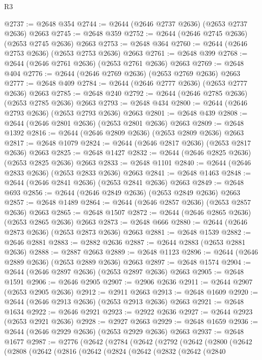 \begin{lexlean}{R3}
\begin{coremodule}
@2737 := @2648 @354
@2744 := @2644 (@2646 @2737 @2636) (@2653 @2737 @2636) @2663
@2745 := @2648 @359
@2752 := @2644 (@2646 @2745 @2636) (@2653 @2745 @2636) @2663
@2753 := @2648 @364
@2760 := @2644 (@2646 @2753 @2636) (@2653 @2753 @2636) @2663
@2761 := @2648 @399
@2768 := @2644 (@2646 @2761 @2636) (@2653 @2761 @2636) @2663
@2769 := @2648 @404
@2776 := @2644 (@2646 @2769 @2636) (@2653 @2769 @2636) @2663
@2777 := @2648 @409
@2784 := @2644 (@2646 @2777 @2636) (@2653 @2777 @2636) @2663
@2785 := @2648 @240
@2792 := @2644 (@2646 @2785 @2636) (@2653 @2785 @2636) @2663
@2793 := @2648 @434
@2800 := @2644 (@2646 @2793 @2636) (@2653 @2793 @2636) @2663
@2801 := @2648 @439
@2808 := @2644 (@2646 @2801 @2636) (@2653 @2801 @2636) @2663
@2809 := @2648 @1392
@2816 := @2644 (@2646 @2809 @2636) (@2653 @2809 @2636) @2663
@2817 := @2648 @1079
@2824 := @2644 (@2646 @2817 @2636) (@2653 @2817 @2636) @2663
@2825 := @2648 @1427
@2832 := @2644 (@2646 @2825 @2636) (@2653 @2825 @2636) @2663
@2833 := @2648 @1101
@2840 := @2644 (@2646 @2833 @2636) (@2653 @2833 @2636) @2663
@2841 := @2648 @1463
@2848 := @2644 (@2646 @2841 @2636) (@2653 @2841 @2636) @2663
@2849 := @2648 @693
@2856 := @2644 (@2646 @2849 @2636) (@2653 @2849 @2636) @2663
@2857 := @2648 @1489
@2864 := @2644 (@2646 @2857 @2636) (@2653 @2857 @2636) @2663
@2865 := @2648 @1507
@2872 := @2644 (@2646 @2865 @2636) (@2653 @2865 @2636) @2663
@2873 := @2648 @666
@2880 := @2644 (@2646 @2873 @2636) (@2653 @2873 @2636) @2663
@2881 := @2648 @1539
@2882 := @2646 @2881
@2883 := @2882 @2636
@2887 := @2644 @2883 (@2653 @2881 @2636)
@2888 := @2887 @2663
@2889 := @2648 @1123
@2896 := @2644 (@2646 @2889 @2636) (@2653 @2889 @2636) @2663
@2897 := @2648 @1574
@2904 := @2644 (@2646 @2897 @2636) (@2653 @2897 @2636) @2663
@2905 := @2648 @1591
@2906 := @2646 @2905
@2907 := @2906 @2636
@2911 := @2644 @2907 (@2653 @2905 @2636)
@2912 := @2911 @2663
@2913 := @2648 @1609
@2920 := @2644 (@2646 @2913 @2636) (@2653 @2913 @2636) @2663
@2921 := @2648 @1634
@2922 := @2646 @2921
@2923 := @2922 @2636
@2927 := @2644 @2923 (@2653 @2921 @2636)
@2928 := @2927 @2663
@2929 := @2648 @1659
@2936 := @2644 (@2646 @2929 @2636) (@2653 @2929 @2636) @2663
@2937 := @2648 @1677
@2987 := @2776
    (@2642
      (@2784
        (@2642
          (@2792
            (@2642
              (@2800
                (@2642
                  (@2808
                    (@2642
                      (@2816
                        (@2642
                          (@2824
                            (@2642
                              (@2832
                                (@2642
                                  (@2840

\end{coremodule}
\end{lexlean}
